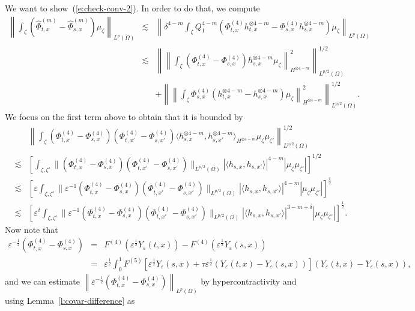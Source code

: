 \documentclass[a4paper,11pt]{article}
\begin{document}
We want to show~(\ref{e:check-conv-2}). In order to do that, we compute
\begin{eqnarray*}
  \left\| \int_{\zeta} (\hat{\Phi}^{(m)}_{t, x} - \hat{\Phi}^{(m)}_{s, x})
  \mu_{\zeta} \right\|_{L^p (\Omega)} & \lesssim & \left\| \delta^{4 - m}
  \int_{\zeta} Q_1^{4 - m}  (\Phi^{(4)}_{t, x} h^{\otimes 4 - m}_{t, x} -
  \Phi^{(4)}_{s, x} h_{s, x}^{\otimes 4 - m}) \mu_{\zeta} \right\|_{L^p
  (\Omega)}\\
  & \lesssim & \left\| \left\| \int_{\zeta} (\Phi^{(4)}_{t, x} -
  \Phi^{(4)}_{s, x}) h_{s, x}^{\otimes 4 - m} \mu_{\zeta}
  \right\|^2_{H^{\otimes 4 - m}} \right\|_{L^{p / 2} (\Omega)}^{1 / 2}\\
  &  & + \left\| \left\| \int_{\zeta} \Phi^{(4)}_{s, x} (h_{t, x}^{\otimes 4
  - m} - h_{s, x}^{\otimes 4 - m}) \mu_{\zeta} \right\|^2_{H^{\otimes 4 - m}}
  \right\|_{L^{p / 2} (\Omega)}^{1 / 2} .
\end{eqnarray*}
We focus on the first term above to obtain that it is bounded by
\begin{eqnarray*}
  &  & \left\| \int_{\zeta} (\Phi^{(4)}_{t, x} - \Phi^{(4)}_{s, x})
  (\Phi^{(4)}_{t, x'} - \Phi^{(4)}_{s, x'}) \langle h_{s, x}^{\otimes 4 - m},
  h_{s, x'}^{\otimes 4 - m} \rangle_{H^{\otimes 4 - m}} \mu_{\zeta}
  \mu_{\zeta'}  \right\|_{L^{p / 2} (\Omega)}^{1 / 2}\\
  & \lesssim & \left[ \int_{\zeta, \zeta'} \| (\Phi^{(4)}_{t, x} -
  \Phi^{(4)}_{s, x}) (\Phi^{(4)}_{t, x'} - \Phi^{(4)}_{s, x'}) \|_{L^{p / 2}
  (\Omega)}  | \langle h_{s, x}, h_{s, x'} \rangle |^{4 - m}  | \mu_{\zeta}
  \mu_{\zeta'} | \right]^{1 / 2}\\
  & \lesssim & \left[ \varepsilon \int_{\zeta, \zeta'} \| \varepsilon^{- 1}
  (\Phi^{(4)}_{t, x} - \Phi^{(4)}_{s, x}) (\Phi^{(4)}_{t, x'} - \Phi^{(4)}_{s,
  x'}) \|_{L^{p / 2} (\Omega)} | \langle h_{s, x}, h_{s, x'} \rangle |^{4 - m}
  | \mu_{\zeta} \mu_{\zeta'} | \right]^{\frac{1}{2}}\\
  & \lesssim & \left[ \varepsilon^{\delta} \int_{\zeta, \zeta'} \|
  \varepsilon^{- 1} (\Phi^{(4)}_{t, x} - \Phi^{(4)}_{s, x}) (\Phi^{(4)}_{t,
  x'} - \Phi^{(4)}_{s, x'}) \|_{L^{p / 2} (\Omega)} | \langle h_{s, x}, h_{s,
  x'} \rangle |^{3 - m + \delta} | \mu_{\zeta} \mu_{\zeta'} |
  \right]^{\frac{1}{2}} .
\end{eqnarray*}
Now note that
\begin{eqnarray*}
  \varepsilon^{- \frac{1}{2}} (\Phi^{(4)}_{t, x} - \Phi^{(4)}_{s, x}) & = &
  F^{(4)} (\varepsilon^{\frac{1}{2}} Y_{\varepsilon} (t, x)) - F^{(4)}
  (\varepsilon^{\frac{1}{2}} Y_{\varepsilon} (s, x))\\
  & = & \varepsilon^{\frac{1}{2}} \int_0^1 F^{(5)} [\varepsilon^{\frac{1}{2}}
  Y_{\varepsilon} (s, x) + \tau \varepsilon^{\frac{1}{2}} (Y_{\varepsilon} (t,
  x) - Y_{\varepsilon} (s, x))]  (Y_{\varepsilon} (t, x) - Y_{\varepsilon} (s,
  x)),
\end{eqnarray*}
and we can estimate $\left\| \varepsilon^{- \frac{1}{2}} (\Phi^{(4)}_{t, x} -
\Phi^{(4)}_{s, x}) \right\|_{L^p (\Omega)}$ by hypercontractivity and using
Lemma~\ref{l:covar-difference} as
\end{document}
